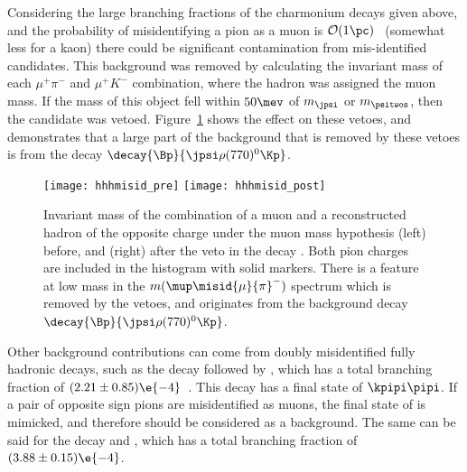 Considering the large branching fractions of the charmonium decays given above, and the probability of
misidentifying a pion as a muon is $\mathcal{O}(1\pc)$~\cite{LHCb-DP-2013-001} (somewhat less for a
kaon) there could be significant contamination from mis-identified candidates.
This background was removed by calculating the invariant mass of each $\mu^+\pi^-$ and
$\mu^+K^-$ combination, where the hadron was assigned the muon mass.
If the mass of this object fell within $50\mev$ of $m_{\jpsi}$ or $m_{\psitwos}$, then the candidate
was vetoed.
Figure~\ref{fig:hhh:misid} shows the effect on these vetoes, and demonstrates that a large part
of the background that is removed by these vetoes is from the decay
$\decay{\Bp}{\jpsi\rho(770)^0\Kp}$.


\begin{figure}
  \begin{center}
    \texttt{[image: hhhmisid\_pre]}
    \texttt{[image: hhhmisid\_post]}
    \caption[Backgrounds from misidentified charmonia]
    {
      Invariant mass of the combination of a muon and a reconstructed hadron of the opposite charge
      under the muon mass hypothesis (left) before, and (right) after the veto in the decay
      \btokpipimumu.
      Both pion charges are included in the histogram with solid markers.
      There is a feature at low mass in the $m(\mup\misid{\mu}{\pi}^-)$ spectrum which is removed by the
      vetoes, and originates from the background decay $\decay{\Bp}{\jpsi\rho(770)^0\Kp}$.
    }
    \label{fig:hhh:misid}
  \end{center}
\end{figure}


Other background contributions can come from doubly misidentified fully hadronic decays, such as
the decay \decay{\Bd}{\Dzb\pip\pipi} followed by \decay{\Dzb}{\kpi}, which
has a total branching fraction of $(2.21\pm0.85)\e{-4}$~\cite{PDG2012}.
This decay has a final state of $\kpipi\pipi$.
If a pair of opposite sign pions are misidentified
as muons, the final state of \kpipimumu is mimicked, and therefore should be considered as a
background.
The same can be said for the decay \decay{\Bd}{\Dzb\pip} and \decay{\Dzb}{\Km\pip\pipi},
which has a total branching fraction of $(3.88\pm0.15)\e{-4}$.

